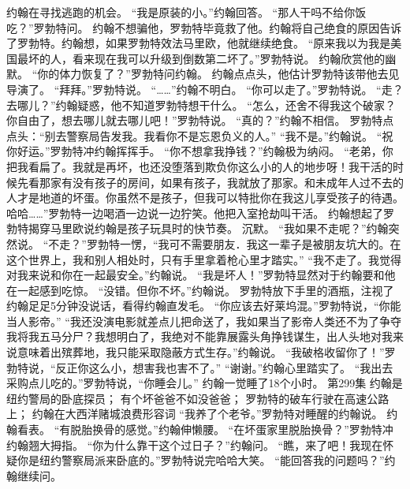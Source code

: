 \documentclass[a4paper,12pt,UTF8,twoside]{ctexbook}
\begin{document}
        约翰在寻找逃跑的机会。  
        “我是原装的小。”约翰回答。  
        “那人干吗不给你饭吃？”罗勃特问。  
        约翰不想骗他，罗勃特毕竟救了他。约翰将自己绝食的原因告诉了罗勃特。约翰想，如果罗勃特效法马里欧，他就继续绝食。  
        “原来我以为我是美国最坏的人，看来现在我可以升级到倒数第二坏了。”罗勃特说。  
        约翰欣赏他的幽默。  
        “你的体力恢复了？”罗勃特问约翰。  
        约翰点点头，他估计罗勃特该带他去见导演了。  
        “拜拜。”罗勃特说。  
        “……”约翰不明白。        
        “你可以走了。”罗勃特说。  
        “走？去哪儿？”约翰疑惑，他不知道罗勃特想干什么。  
        “怎么，还舍不得我这个破家？你自由了，想去哪儿就去哪儿吧！”罗勃特说。  
        “真的？”约翰不相信。  
        罗勃特点点头：“别去警察局告发我。我看你不是忘恩负义的人。”  
        “我不是。”约翰说。  
        “祝你好运。”罗勃特冲约翰挥挥手。  
        “你不想拿我挣钱？”约翰极为纳闷。  
        “老弟，你把我看扁了。我就是再坏，也还没堕落到欺负你这么小的人的地步呀！我干活的时候先看那家有没有孩子的房间，如果有孩子，我就放了那家。和未成年人过不去的人才是地道的坏蛋。你虽然不是孩子，但我可以特批你在我这儿享受孩子的待遇。哈哈……”罗勃特一边喝酒一边说一边狞笑。他把入室抢劫叫干活。  
        约翰想起了罗勃特揭穿马里欧说约翰是孩子玩具时的快节奏。  
        沉默。  
        “我如果不走呢？”约翰突然说。  
        “不走？”罗勃特一愣，“我可不需要朋友．我这一辈子是被朋友坑大的。在这个世界上，我和别人相处时，只有手里拿着枪心里才踏实。”  
        “我不走了。我觉得对我来说和你在一起最安全。”约翰说。  
        “我是坏人！”罗勃特显然对于约翰要和他在一起感到吃惊。  
        “没错。但你不坏。”约翰说。  
        罗勃特放下手里的酒瓶，注视了约翰足足5分钟没说话，看得约翰直发毛。  
        “你应该去好莱坞混。”罗勃特说，“你能当人影帝。”  
        “我还没演电影就差点儿把命送了，我如果当了影帝人类还不为了争夺我将我五马分尸？我想明白了，我绝对不能靠展露头角挣钱谋生，出人头地对我来说意味着出殡葬地，我只能采取隐蔽方式生存。”约翰说。  
        “我破格收留你了！”罗勃特说，“反正你这么小，想害我也害不了。”  
        “谢谢。”约翰心里踏实了。  
        “我出去采购点儿吃的。”罗勃特说，“你睡会儿。”  
        约翰一觉睡了18个小时。          第299集  
        约翰是纽约警局的卧底探员；  
        有个坏爸爸不如没爸爸；  
        罗勃特的破车行驶在高速公路上；  
        约翰在大西洋赌城浪费形容词    
        “我养了个老爷。”罗勃特对睡醒的约翰说。  
        约翰看表。  
        “有脱胎换骨的感觉。”约翰伸懒腰。  
        “在坏蛋家里脱胎换骨？”罗勃特冲约翰翘大拇指。  
        “你为什么靠干这个过日子？”约翰问。  
        “瞧，来了吧！我现在怀疑你是纽约警察局派来卧底的。”罗勃特说完哈哈大笑。  
        “能回答我的问题吗？”约翰继续问。  
\end{document}
